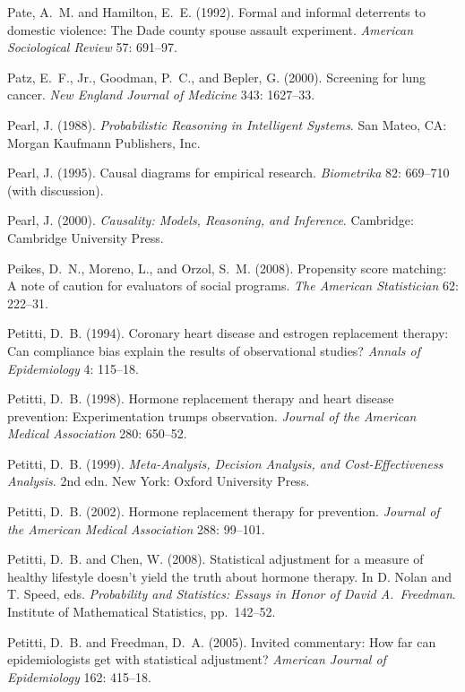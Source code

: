 \smallskip\noindent
Pate, A.~M. and Hamilton, E.~E. (1992).
Formal and informal deterrents to domestic violence:
The Dade county spouse assault experiment.
{\it American Sociological Review\/} {57}: 691--97.

\smallskip\noindent
Patz, E.~F., Jr., Goodman, P.~C., and Bepler, G. (2000).
Screening for lung cancer.
{\it New England Journal of Medicine\/} 343: 1627--33.

\smallskip\noindent
Pearl, J. (1988).
{\it Probabilistic Reasoning in Intelligent Systems\/}.
San Mateo, CA: Morgan Kaufmann Publishers, Inc.

\smallskip\noindent
Pearl, J. (1995).
Causal diagrams for empirical research.
{\it Biometrika} 82: 669--710 (with discussion).

\smallskip\noindent
Pearl, J. (2000).
{\it Causality: Models, Reasoning, and Inference\/}.
Cambridge: Cambridge University Press.

\smallskip\noindent
Peikes, D.~N., Moreno, L., and Orzol, S.~M. (2008).
Propensity score matching: A note of caution for evaluators of social programs.
{\it The American Statistician\/} 62: 222--31.

\smallskip\noindent
Petitti, D.~B. (1994).
Coronary heart disease and estrogen replacement therapy:
Can compliance bias explain the results of observational studies?
{\it Annals of Epidemiology\/} 4: 115--18.

\smallskip\noindent
Petitti, D.~B. (1998).
Hormone replacement therapy and heart disease prevention: Experimentation trumps observation.
{\it Journal of the American Medical Association\/} 280: 650--52.

\smallskip\noindent
Petitti, D.~B. (1999).
{\it Meta-Analysis, Decision Analysis, and Cost-Effect\-ive\-ness Analysis\/}. 2nd edn.
New York: Oxford University Press.

\smallskip\noindent
Petitti, D.~B. (2002).
Hormone replacement therapy for prevention.
{\it Journal of the American Medical Association\/} 288: 99--101.

\smallskip\noindent
Petitti, D.~B. and Chen, W. (2008).
Statistical adjustment for a measure of healthy lifestyle
doesn't yield the truth about hormone therapy.
In D. Nolan and T. Speed, eds.
{\it Probability and Statistics: Essays in Honor of David A.~Freedman\/}.
Institute of Mathematical Statistics, pp.~142--52.

\smallskip\noindent
Petitti, D.~B. and Freedman, D.~A. (2005).
Invited commentary: How far can epidemiologists get with statistical adjustment?
{\it American Journal of Epidemiology\/} 162: 415--18.

